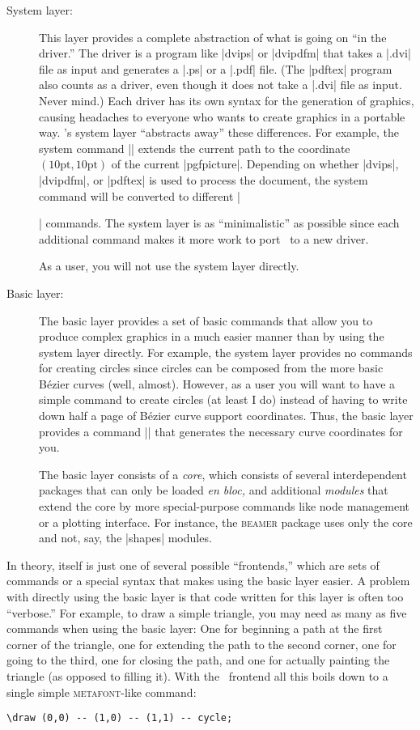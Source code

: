 \begin{description}
\item[System layer:] This layer provides a complete abstraction of what is
  going on ``in the driver.'' The driver is a program like |dvips| or
  |dvipdfm| that takes a |.dvi| file as input and generates a |.ps| or
  a |.pdf| file. (The |pdftex| program also counts as a driver, even
  though it does not take a |.dvi| file as input. Never mind.) Each
  driver has its own syntax for the generation of graphics, causing
  headaches to everyone who wants to create graphics in a portable
  way. \pgfname's system layer ``abstracts away'' these
  differences. For example, the system command
  |\pgfsys@lineto{10pt}{10pt}| extends the current path  to the coordinate
  $(10\mathrm{pt},10\mathrm{pt})$ of the current
  |{pgfpicture}|. Depending on whether |dvips|,
  |dvipdfm|, or |pdftex| is used to process the document, the system
  command will be converted to different |\special| commands.
  The system layer is as ``minimalistic'' as possible since each
  additional command makes it more work to port \pgfname\ to a new
  driver.

  As a user, you will not use the system layer directly.
\item[Basic layer:]
  The basic layer provides a set of basic commands that allow
  you to produce complex graphics in a much easier manner than by using
  the system layer directly. For example,  the system layer provides
  no commands for creating circles since circles can be composed from
  the more basic B\'ezier curves (well, almost). However, as a user you
  will want to have a simple command to create circles
  (at least I do) instead of having to write down half a page of
  B\'ezier curve support coordinates. Thus, the basic layer provides a
  command |\pgfpathcircle| that generates the necessary curve
  coordinates for you.

  The basic layer consists of a \emph{core}, which consists of
  several interdependent packages that can only be loaded \emph{en
    bloc,} and additional \emph{modules} that extend the core by more
  special-purpose commands like node management or a plotting
  interface. For instance, the \textsc{beamer} package uses only the
  core and not, say, the |shapes| modules.
\end{description}  

In theory, \tikzname itself is just one of several possible
``frontends,'' which are sets of commands or a special syntax that
makes using the basic layer easier. A problem with directly using the
basic layer is that code written for this layer is often too
``verbose.'' For example, to draw a simple 
triangle, you may need as many as five commands when using the basic
layer: One for beginning a path at the first corner of the triangle,
one for extending the path to the second corner, one for going to
the third, one for closing the path, and one for actually painting
the triangle (as opposed to filling it). With the \tikzname\ frontend
all this boils down to a single simple \textsc{metafont}-like
command:
\begin{verbatim}
\draw (0,0) -- (1,0) -- (1,1) -- cycle;
\end{verbatim}

